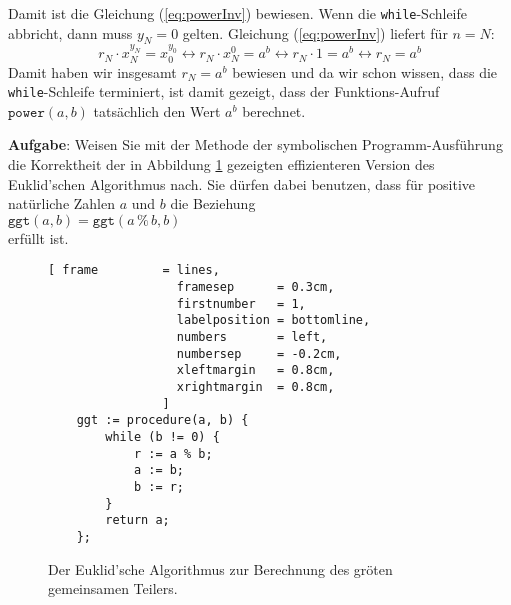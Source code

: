 Damit ist die Gleichung (\ref{eq:powerInv}) bewiesen.   Wenn die \texttt{while}-Schleife
abbricht, dann muss $y_N = 0$ gelten.  Gleichung (\ref{eq:powerInv}) liefert f\"ur $n=N$:
\[ r_N \cdot x_N^{y_N} = x_0^{y_0} 
  \leftrightarrow  r_N \cdot x_N^{0}   = a^b
  \leftrightarrow  r_N \cdot 1         = a^b
  \leftrightarrow  r_N                 = a^b
\]
Damit haben wir insgesamt $r_N = a^b$ bewiesen und da wir schon wissen, dass
die \texttt{while}-Schleife terminiert, ist damit gezeigt, dass der
Funktions-Aufruf $\texttt{power}(a,b)$ tats\"achlich den Wert $a^b$ berechnet.
\vspace*{0.3cm}
\pagebreak

\noindent
\textbf{Aufgabe}:  Weisen Sie mit der Methode der symbolischen Programm-Ausf\"uhrung die
Korrektheit der in Abbildung \ref{fig:gcd.c} gezeigten effizienteren Version des
Euklid'schen Algorithmus nach. 
Sie d\"urfen dabei benutzen, dass f\"ur positive nat\"urliche Zahlen $a$ und $b$ die Beziehung 
\\[0.2cm]
\hspace*{1.3cm}
$\mathtt{ggt}(a, b) = \mathtt{ggt}(a \,\texttt{\%}\, b, b)$
\\[0.2cm]
erf\"ullt ist.  

\begin{figure}[!ht]
\centering
\begin{Verbatim}[ frame         = lines, 
                  framesep      = 0.3cm, 
                  firstnumber   = 1,
                  labelposition = bottomline,
                  numbers       = left,
                  numbersep     = -0.2cm,
                  xleftmargin   = 0.8cm,
                  xrightmargin  = 0.8cm,
                ]
    ggt := procedure(a, b) {
        while (b != 0) {
            r := a % b;
            a := b;
            b := r;
        }
        return a;
    };
\end{Verbatim}
\vspace*{-0.3cm}
\caption{Der Euklid'sche Algorithmus zur Berechnung des gr\"o\3ten gemeinsamen Teilers.}
\label{fig:gcd.c}
\end{figure}


